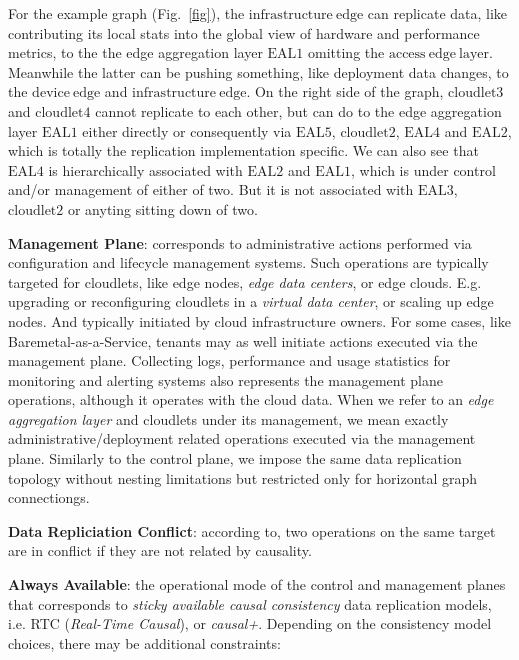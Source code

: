 \documentclass[conference]{IEEEtran}
\begin{document}
For the example graph (Fig.~\ref{fig}), the $\mathrm{infrastructure\ edge}$ can
replicate data, like contributing its local stats into the global view of
hardware and performance metrics, to the the edge aggregation layer
$\mathrm{EAL1}$ omitting the $\mathrm{access\ edge\ layer}$. Meanwhile the
latter can be pushing something, like deployment data changes, to the
$\mathrm{device\ edge}$ and $\mathrm{infrastructure\ edge}$. On the right side
of the graph, $\mathrm{cloudlet3}$ and $\mathrm{cloudlet4}$ cannot replicate to
each other, but can do to the edge aggregation layer $\mathrm{EAL1}$ either
directly or consequently via $\mathrm{EAL5}$, $\mathrm{cloudlet2}$,
$\mathrm{EAL4}$ and $\mathrm{EAL2}$, which is totally the replication
implementation specific. We can also see that $\mathrm{EAL4}$ is
hierarchically associated with $\mathrm{EAL2}$ and $\mathrm{EAL1}$, which is
under control and/or management of either of two. But it is not associated with
$\mathrm{EAL3}$, $\mathrm{cloudlet2}$ or anyting sitting down of two.

\textbf{Management Plane}: corresponds to administrative actions performed via
configuration and lifecycle management systems. Such operations are typically
targeted for cloudlets, like edge nodes, \textit{edge data centers}\cite{b3},
or edge clouds. E.g. upgrading or reconfiguring cloudlets in a \textit{virtual
data center}\cite{b3}, or scaling up edge nodes. And typically initiated by
cloud infrastructure owners. For some cases, like Baremetal-as-a-Service,
tenants may as well initiate actions executed via the management plane.
Collecting logs, performance and usage statistics for monitoring and alerting
systems also represents the management plane operations, although it operates
with the cloud data. When we refer to an \textit{edge aggregation
layer}\cite{b3} and cloudlets under its management, we mean exactly
administrative/deployment related operations executed via the management plane.
Similarly to the control plane, we impose the same data replication topology
without nesting limitations but restricted only for horizontal graph
connectiongs.

\textbf{Data Repliciation Conflict}: according to\cite{b1}, two operations on
the same target are in conflict if they are not related by causality.

\textbf{Always Available}: the operational mode of the control and management
planes that corresponds to \textit{sticky available causal
consistency}\cite{b4} data replication models, i.e. RTC (\textit{Real-Time
Causal}\cite{b2}), or \textit{causal+}\cite{b1}. Depending on the consistency
model choices, there may be additional constraints:
\end{document}

